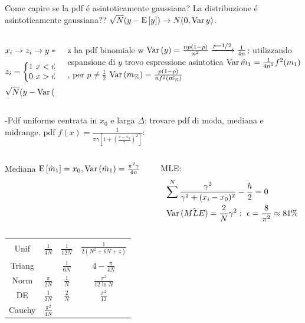 \documentclass[asd-beamer.tex]{subfiles}
\begin{document}
\begin{frame}{Come capire se la pdf \'e asintoticamente gaussiana?}
La distribuzione \'e asintoticamente gaussiana?? $\sqrt{N}(y-\operatorname{E}{[y]})\to N(0,\operatorname{Var}{y})$.
\begin{columns}[T]
\begin{column}{0.5\textwidth}
\begin{align*}
&x_i\to z_i\to y=\frac{1}{N}\sum z_i\\
&z_i=\left\{\begin{matrix}1\ x<\hat{m}_1\\0\ x>\hat{m}_1\\\end{matrix}\right.\\
&\sqrt{N}(y-\operatorname{Var}{(y)})\xrightarrow{\operatorname{\mathcal{P}}{}}N(0,\operatorname{Var}{(y)})
\end{align*}
\end{column}
\begin{column}{0.5\textwidth}
z ha pdf binomiale w $\operatorname{Var}{(y)}=\frac{np(1-p)}{n^2}\xrightarrow{p=1/2}\frac{1}{4n}$: utilizzando espansione di $y$ trovo espressione asintotica $\operatorname{Var}{\hat{m}_1}=\frac{1}{4n^2}f^2(m_1)$, per $p\neq\frac{1}{2}$ $\operatorname{Var}{(m_{\%})}=\frac{p(1-p)}{nf^2(\hat{m_{\%}})}$
\end{column}
\end{columns}
-Pdf uniforme centrata in $x_0$ e larga $\Delta$: trovare pdf di moda, mediana e midrange.
pdf $f(x)=\frac{1}{\pi\gamma[1+(\frac{x-x_0}{\gamma})^2]}$:
\begin{columns}[T]
\begin{column}{0.5\textwidth}
Mediana
$\operatorname{E}{[\hat{m}_1]}=x_0, \operatorname{Var}{(\hat{m}_1)}=\frac{\pi^2\gamma}{4n}$
\end{column}
\begin{column}{0.5\textwidth}
MLE:
\begin{align*}
&\sum^N\frac{\gamma^2}{\gamma^2+(x_i-x_0)^2}-\frac{h}{2}=0\\
&\operatorname{Var}{(\hat{MLE})}=\frac{2}{N}\gamma^2:\ \epsilon=\frac{8}{\pi^2}\approx81\%
\end{align*}
\end{column}
\end{columns}
\begin{tabular}{c|ccc}
Unif & $\frac{1}{4N}$ & $\frac{1}{12N}$ & $\frac{1}{2(N^2+6N+4)}$\\
Triang & & $\frac{1}{6N}$ & $4-\frac{\pi}{4N}$\\
Norm & $\frac{\pi}{2N}$ & $\frac{1}{N}$ & $\frac{\pi^2}{12\ln{N}}$\\
DE & $\frac{1}{2N}$ & $\frac{2}{N}$ & $\frac{\pi^2}{12}$\\
Cauchy & $\frac{\pi^2}{4N}$ & & \\
\end{tabular}
\end{frame}
\end{document}
